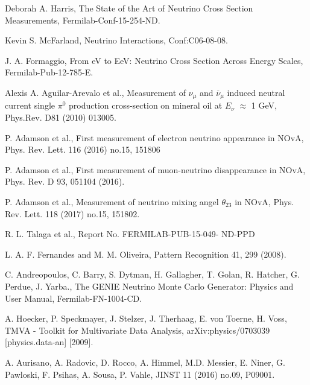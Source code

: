 \documentclass[12pt]{article}
\begin{document}
\begin{thebibliography}{99}





Deborah A. Harris, The State of the Art of Neutrino Cross Section Measurements, Fermilab-Conf-15-254-ND.

Kevin S. McFarland, Neutrino Interactions, Conf:C06-08-08.

J. A. Formaggio, From eV to EeV: Neutrino Cross Section Across Energy Scales, Fermilab-Pub-12-785-E.

Alexis A. Aguilar-Arevalo et al., Measurement of $\nu_{\mu}$ and  $\overbar{\nu}_{\mu}$ induced neutral current single $\pi^{0}$ production cross-section on mineral oil at $E_{\nu}$ $\approx$ 1 GeV, Phys.Rev. D81 (2010) 013005. 

P. Adamson et al., First measurement of electron neutrino appearance in NOvA, Phys. Rev. Lett. 116 (2016) no.15, 151806

P. Adamson et al., First measurement of muon-neutrino disappearance in NOvA, Phys. Rev. D 93, 051104 (2016).

P. Adamson et al., Measurement of neutrino mixing angel $\theta_{23}$ in NOvA, Phys. Rev. Lett.  118 (2017) no.15, 151802.

R. L. Talaga et al., Report No. FERMILAB-PUB-15-049- ND-PPD	

L. A. F. Fernandes and M. M. Oliveira, Pattern Recognition 41, 299 (2008).
	
C. Andreopoulos, C. Barry, S. Dytman, H. Gallagher, T. Golan, R. Hatcher, G. Perdue, J. Yarba., The GENIE Neutrino Monte Carlo Generator: Physics and User Manual, Fermilab-FN-1004-CD.

A. Hoecker, P. Speckmayer, J. Stelzer, J. Therhaag, E. von Toerne, H. Voss, TMVA - Toolkit for Multivariate Data Analysis, arXiv:physics/0703039 [physics.data-an] [2009].

A. Aurisano, A. Radovic, D. Rocco, A. Himmel, M.D. Messier, E. Niner, G. Pawloski, F. Psihas, A. Sousa, P. Vahle, JINST 11 (2016) no.09, P09001.

\end{thebibliography}
\end{document}
